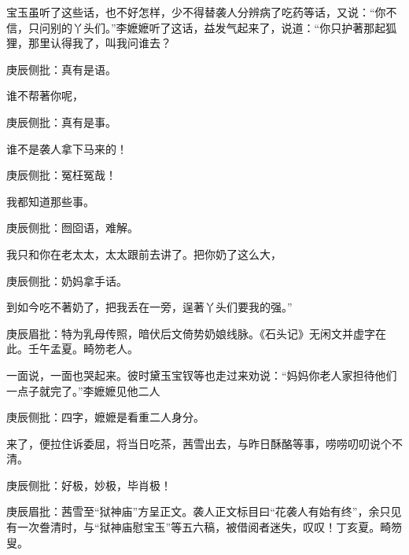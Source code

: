 \begin{parag}
    宝玉虽听了这些话，也不好怎样，少不得替袭人分辨病了吃药等话，又说：“你不信，只问别的丫头们。”李嬷嬷听了这话，益发气起来了，说道：“你只护著那起狐狸，那里认得我了，叫我问谁去？\begin{note}庚辰侧批：真有是语。\end{note}谁不帮著你呢，\begin{note}庚辰侧批：真有是事。\end{note}谁不是袭人拿下马来的！\begin{note}庚辰侧批：冤枉冤哉！\end{note}我都知道那些事。\begin{note}庚辰侧批：囫囵语，难解。\end{note}我只和你在老太太，太太跟前去讲了。把你奶了这么大，\begin{note}庚辰侧批：奶妈拿手话。\end{note}到如今吃不著奶了，把我丢在一旁，逞著丫头们要我的强。”\begin{note}庚辰眉批：特为乳母传照，暗伏后文倚势奶娘线脉。《石头记》无闲文并虚字在此。壬午孟夏。畸笏老人。\end{note}一面说，一面也哭起来。彼时黛玉宝钗等也走过来劝说：“妈妈你老人家担待他们一点子就完了。”李嬷嬷见他二人\begin{note}庚辰侧批：四字，嬷嬷是看重二人身分。\end{note}来了，便拉住诉委屈，将当日吃茶，茜雪出去，与昨日酥酪等事，唠唠叨叨说个不清。\begin{note}庚辰侧批：好极，妙极，毕肖极！\end{note}\begin{note}庚辰眉批：茜雪至“狱神庙”方呈正文。袭人正文标目曰“花袭人有始有终”，余只见有一次誊清时，与“狱神庙慰宝玉”等五六稿，被借阅者迷失，叹叹！丁亥夏。畸笏叟。\end{note}
\end{parag}


